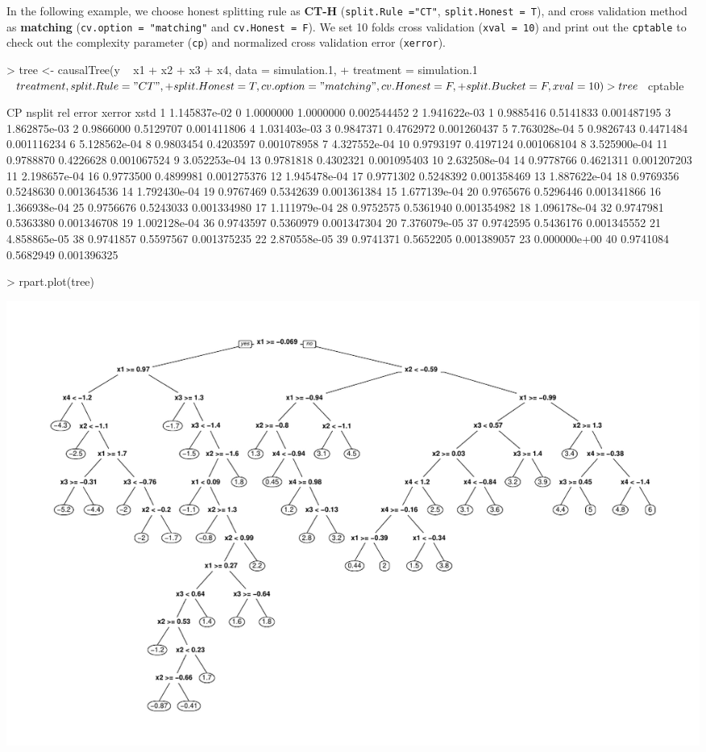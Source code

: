 \documentclass[11pt]{article}
\renewenvironment{Schunk}{\vspace{\topsep}}{\vspace{\topsep}}
\begin{document}
In the following example, we choose honest splitting rule as \textbf{CT-H} (\texttt{split.Rule ="CT"}, \texttt{split.Honest = T}), and cross validation method as \textbf{matching} (\texttt{cv.option = "matching"} and \texttt{cv.Honest = F}). We set 10 folds cross validation (\texttt{xval = 10}) and print out the \texttt{cptable} to check out the complexity parameter (\texttt{cp}) and normalized cross validation error (\texttt{xerror}).
\begin{Schunk}
\begin{Sinput}
> tree <- causalTree(y ~ x1 + x2 + x3 + x4, data = simulation.1, 
+                   treatment = simulation.1$treatment, split.Rule = "CT",
+                   split.Honest = T, cv.option = "matching", cv.Honest = F, 
+                   split.Bucket = F, xval = 10)
> tree$cptable
\end{Sinput}
\begin{Soutput}
             CP nsplit rel error    xerror        xstd
1  1.145837e-02      0 1.0000000 1.0000000 0.002544452
2  1.941622e-03      1 0.9885416 0.5141833 0.001487195
3  1.862875e-03      2 0.9866000 0.5129707 0.001411806
4  1.031403e-03      3 0.9847371 0.4762972 0.001260437
5  7.763028e-04      5 0.9826743 0.4471484 0.001116234
6  5.128562e-04      8 0.9803454 0.4203597 0.001078958
7  4.327552e-04     10 0.9793197 0.4197124 0.001068104
8  3.525900e-04     11 0.9788870 0.4226628 0.001067524
9  3.052253e-04     13 0.9781818 0.4302321 0.001095403
10 2.632508e-04     14 0.9778766 0.4621311 0.001207203
11 2.198657e-04     16 0.9773500 0.4899981 0.001275376
12 1.945478e-04     17 0.9771302 0.5248392 0.001358469
13 1.887622e-04     18 0.9769356 0.5248630 0.001364536
14 1.792430e-04     19 0.9767469 0.5342639 0.001361384
15 1.677139e-04     20 0.9765676 0.5296446 0.001341866
16 1.366938e-04     25 0.9756676 0.5243033 0.001334980
17 1.111979e-04     28 0.9752575 0.5361940 0.001354982
18 1.096178e-04     32 0.9747981 0.5363380 0.001346708
19 1.002128e-04     36 0.9743597 0.5360979 0.001347304
20 7.376079e-05     37 0.9742595 0.5436176 0.001345552
21 4.858865e-05     38 0.9741857 0.5597567 0.001375235
22 2.870558e-05     39 0.9741371 0.5652205 0.001389057
23 0.000000e+00     40 0.9741084 0.5682949 0.001396325
\end{Soutput}
\begin{Sinput}
> rpart.plot(tree)
\end{Sinput}
\end{Schunk}
\includegraphics{briefintro-example2}
\end{document}
